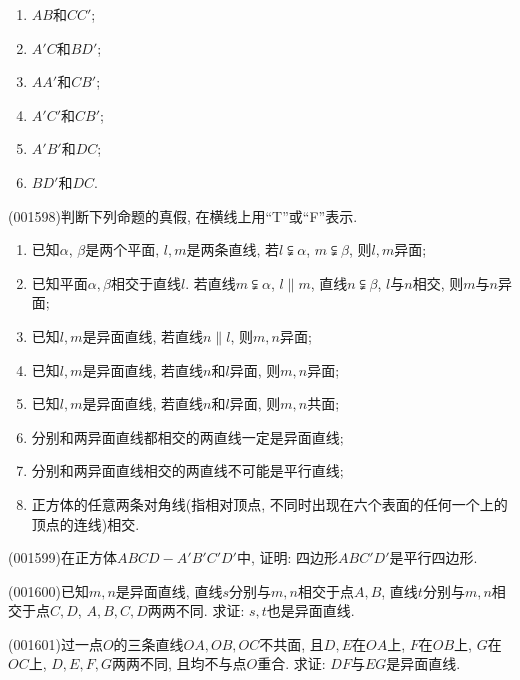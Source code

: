 \begin{enumerate}[\blank{50}(1)]
\item $AB$和$CC'$;\\ 
\item $A'C$和$BD'$;\\ 
\item $AA'$和$CB'$;\\ 
\item $A'C'$和$CB'$;\\ 
\item $A'B'$和$DC$;\\ 
\item $BD'$和$DC$.\\ 
\end{enumerate}
\item (001598)判断下列命题的真假, 在横线上用``T''或``F''表示.
\begin{enumerate}[\blank{30}(1)]
\item 已知$\alpha$, $\beta$是两个平面, $l,m$是两条直线, 若$l\subsetneqq \alpha$, $m\subsetneqq \beta$, 则$l,m$异面;\\ 
\item 已知平面$\alpha,\beta$相交于直线$l$. 若直线$m\subsetneqq \alpha$, $l \parallel m$, 直线$n\subsetneqq \beta$, $l$与$n$相交, 则$m$与$n$异面;\\ 
\item 已知$l,m$是异面直线, 若直线$n\parallel l$, 则$m,n$异面;\\ 
\item 已知$l,m$是异面直线, 若直线$n$和$l$异面, 则$m,n$异面;\\ 
\item 已知$l,m$是异面直线, 若直线$n$和$l$异面, 则$m,n$共面;\\ 
\item 分别和两异面直线都相交的两直线一定是异面直线;\\ 
\item 分别和两异面直线相交的两直线不可能是平行直线;\\ 
\item 正方体的任意两条对角线(指相对顶点, 不同时出现在六个表面的任何一个上的顶点的连线)相交.\\ 
\end{enumerate}
\item (001599)在正方体$ABCD-A'B'C'D'$中, 证明: 四边形$ABC'D'$是平行四边形.
\item (001600)已知$m,n$是异面直线, 直线$s$分别与$m,n$相交于点$A,B$, 直线$t$分别与$m,n$相交于点$C,D$, $A,B,C,D$两两不同. 求证: $s,t$也是异面直线.
\item (001601)过一点$O$的三条直线$OA,OB,OC$不共面, 且$D,E$在$OA$上, $F$在$OB$上, $G$在$OC$上, $D,E,F,G$两两不同, 且均不与点$O$重合. 求证: $DF$与$EG$是异面直线.
